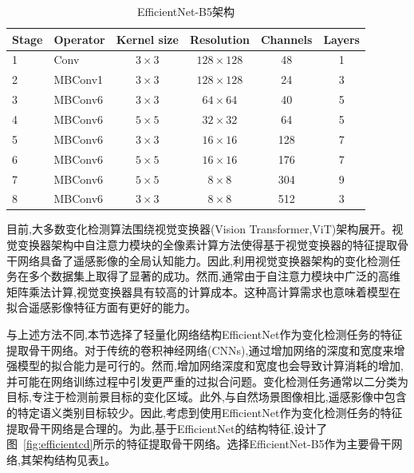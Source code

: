 \begin{table}[!htb]
\centering
\caption{EfficientNet-B5架构}
\label{tab:efficientnet-b5}
\begin{tabular}{l l c c c c}
\toprule
\textbf{Stage} & \textbf{Operator} & \textbf{Kernel size} & \textbf{Resolution} & \textbf{Channels} & \textbf{Layers} \\
\midrule
1     & Conv       & $3\times3$     & $128\times128$  & 48       & 1      \\
2     & MBConv1    & $3\times3$     & $128\times128$  & 24       & 3      \\
3     & MBConv6    & $3\times3$     & $64\times64$    & 40       & 5      \\
4     & MBConv6    & $5\times5$     & $32\times32$    & 64       & 5      \\
5     & MBConv6    & $3\times3$     & $16\times16$    & 128      & 7      \\
6     & MBConv6    & $5\times5$     & $16\times16$    & 176      & 7      \\
7     & MBConv6    & $5\times5$     & $8\times8$      & 304      & 9      \\
8     & MBConv6    & $3\times3$     & $8\times8$      & 512      & 3      \\
\bottomrule
\end{tabular}
\end{table}


目前,大多数变化检测算法围绕视觉变换器(Vision Transformer,ViT)架构展开。视觉变换器架构中自注意力模块的全像素计算方法使得基于视觉变换器的特征提取骨干网络具备了遥感影像的全局认知能力。因此,利用视觉变换器架构的变化检测任务在多个数据集上取得了显著的成功。然而,通常由于自注意力模块中广泛的高维矩阵乘法计算,视觉变换器具有较高的计算成本。这种高计算需求也意味着模型在拟合遥感影像特征方面有更好的能力。

与上述方法不同,本节选择了轻量化网络结构EfficientNet作为变化检测任务的特征提取骨干网络。对于传统的卷积神经网络(CNNs),通过增加网络的深度和宽度来增强模型的拟合能力是可行的。然而,增加网络深度和宽度也会导致计算消耗的增加,并可能在网络训练过程中引发更严重的过拟合问题。变化检测任务通常以二分类为目标,专注于检测前景目标的变化区域。此外,与自然场景图像相比,遥感影像中包含的特定语义类别目标较少。因此,考虑到使用EfficientNet作为变化检测任务的特征提取骨干网络是合理的。为此,基于EfficientNet的结构特征,设计了图~\ref{fig:efficientcd}所示的特征提取骨干网络。选择EfficientNet-B5作为主要骨干网络,其架构结构见表\ref{tab:efficientnet-b5}。

